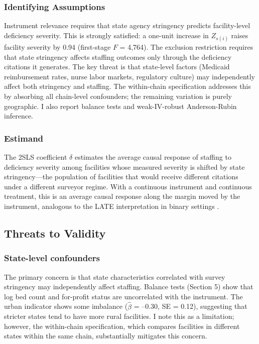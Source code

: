\documentclass[12pt]{article}
\begin{document}
\subsubsection*{Identifying Assumptions} Instrument relevance requires that state agency stringency predicts facility-level deficiency severity. This is strongly satisfied: a one-unit increase in $Z_{s(i)}$ raises facility severity by 0.94 (first-stage $F$ = 4,764). The exclusion restriction requires that state stringency affects staffing outcomes only through the deficiency citations it generates. The key threat is that state-level factors (Medicaid reimbursement rates, nurse labor markets, regulatory culture) may independently affect both stringency and staffing. The within-chain specification addresses this by absorbing all chain-level confounders; the remaining variation is purely geographic. I also report balance tests and weak-IV-robust Anderson-Rubin inference.

\subsubsection*{Estimand} The 2SLS coefficient $\delta$ estimates the average causal response of staffing to deficiency severity among facilities whose measured severity is shifted by state stringency---the population of facilities that would receive different citations under a different surveyor regime. With a continuous instrument and continuous treatment, this is an average causal response along the margin moved by the instrument, analogous to the LATE interpretation in binary settings \citep{Angrist1996}.

\subsection{Threats to Validity}

\subsubsection*{State-level confounders} The primary concern is that state characteristics correlated with survey stringency may independently affect staffing. Balance tests (Section 5) show that log bed count and for-profit status are uncorrelated with the instrument. The urban indicator shows some imbalance ($\hat{\beta}$ = --0.30, SE = 0.12), suggesting that stricter states tend to have more rural facilities. I note this as a limitation; however, the within-chain specification, which compares facilities in different states within the same chain, substantially mitigates this concern.
\end{document}
